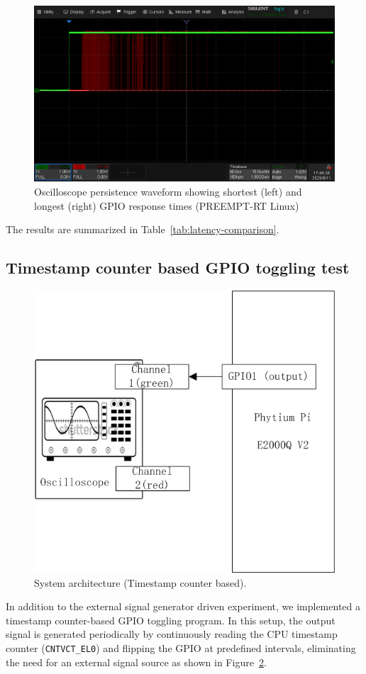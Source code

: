 \documentclass[letterpaper]{article}
\begin{document}
\begin{figure}[h]
  \centering
  \includegraphics[width=0.8\linewidth]{figures/linuxintgpio.png}
  \caption{Oscilloscope persistence waveform showing shortest (left) and longest (right) GPIO response times (PREEMPT-RT Linux)}
  \label{fig:linuxintgpio}
\end{figure}

The results are summarized in Table~\ref{tab:latency-comparison}.

\subsection {Timestamp counter based GPIO toggling test}

\begin{figure}
    \centering
    \includegraphics[width=0.85\columnwidth]{evaluation-ts.jpg}
    \caption{System architecture (Timestamp counter based).}
    \label{fig:oscilloscopets}
\end{figure}
In addition to the external signal generator driven experiment, we implemented a timestamp counter-based GPIO toggling program. In this setup, the output signal is generated periodically by continuously reading the CPU timestamp counter (\texttt{CNTVCT\_EL0}) and flipping the GPIO at predefined intervals, eliminating the need for an external signal source as shown in Figure~\ref{fig:oscilloscopets}.
\end{document}
